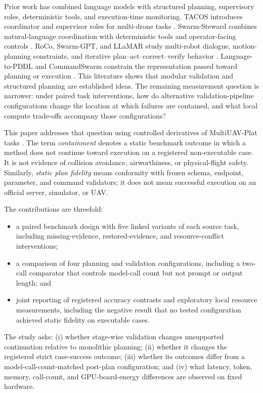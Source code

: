 \documentclass{article}
\begin{document}
Prior work has combined language models with structured planning, supervisory
roles, deterministic tools, and execution-time monitoring. TACOS introduces
coordinator and supervisor roles for multi-drone tasks \cite{tacos}.
Swarm-Steward combines natural-language coordination with deterministic tools
and operator-facing controls \cite{swarm_steward}. RoCo, Swarm-GPT, and LLaMAR
study multi-robot dialogue, motion-planning constraints, and iterative
plan--act--correct--verify behavior \cite{roco,swarm_gpt,llamar}.
Language-to-PDDL and CommandSwarm constrain the representation passed toward
planning or execution \cite{language_pddl,commandswarm}. This literature shows
that modular validation and structured planning are established ideas. The
remaining measurement question is narrower: under paired task interventions,
how do alternative validation-pipeline configurations change the location at
which failures are contained, and what local compute trade-offs accompany
those configurations?

This paper addresses that question using controlled derivatives of
MultiUAV-Plat tasks \cite{multiuav_plat}. The term \emph{containment} denotes a
static benchmark outcome in which a method does not continue toward execution
on a registered non-executable case. It is not evidence of collision avoidance,
airworthiness, or physical-flight safety. Similarly, \emph{static plan
fidelity} means conformity with frozen schema, endpoint, parameter, and command
validators; it does not mean successful execution on an official server,
simulator, or UAV.

The contributions are threefold:
\begin{itemize}
  \item a paired benchmark design with five linked variants of each source task,
        including missing-evidence, restored-evidence, and resource-conflict
        interventions;
  \item a comparison of four planning and validation configurations, including
        a two-call comparator that controls model-call count but not prompt or
        output length; and
  \item joint reporting of registered accuracy contrasts and exploratory local
        resource measurements, including the negative result that no tested
        configuration achieved static fidelity on executable cases.
\end{itemize}

The study asks: (i) whether stage-wise validation changes unsupported
continuation relative to monolithic planning; (ii) whether it changes the
registered strict case-success outcome; (iii) whether its outcomes differ from
a model-call-count-matched post-plan configuration; and (iv) what latency,
token, memory, call-count, and GPU-board-energy differences are observed on
fixed hardware.
\end{document}
